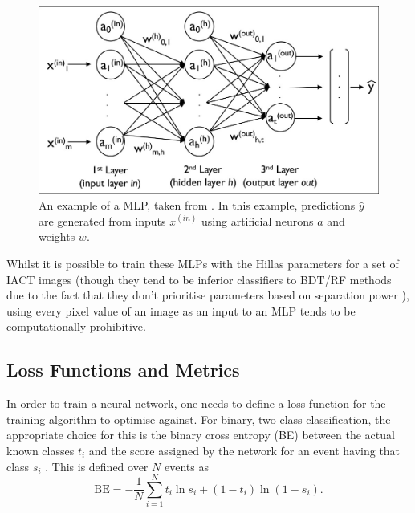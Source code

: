 \begin{figure}[ht] 
        \centering \includegraphics[width=\columnwidth]{figures/MLP.jpeg}
        \caption{
                \label{fig:mlp} %
                An example of a MLP, taken from \cite{newmlp}. In this example, predictions $\hat{y}$ are generated from inputs $x^{(in)}$ using artificial neurons $a$ and weights $w$.
        }
\end{figure}

Whilst it is possible to train these MLPs with the Hillas parameters for a set of IACT images (though they tend to be inferior classifiers to BDT/RF methods due to the fact that they don't prioritise parameters based on separation power \cite{hessbdt}), 
using every pixel value of an image as an input to an MLP tends to be computationally prohibitive.

\subsection{Loss Functions and Metrics}
\label{MLdefs}
In order to train a neural network, one needs to define a loss function for the training algorithm to optimise against. For binary, two class classification, the appropriate choice for this is the  binary cross entropy (BE) between the actual known classes $t_i$ and the score assigned by the network for an event having that class $s_i$ \cite{Keras}. This is defined over $N$ events as
\begin{equation}
    \label{eq:binary}
    \textrm{BE}=-\frac{1}{N}\sum_{i=1}^{N}t_i\ln{s_i}+(1-t_i)\ln{(1-s_i)}.
\end{equation}


